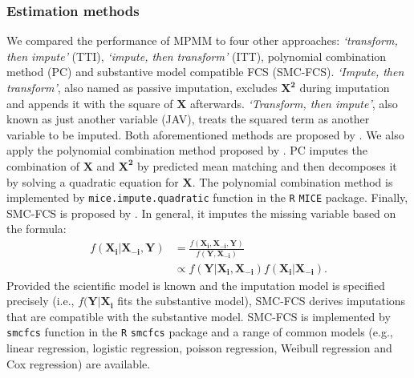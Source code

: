 	\subsubsection{Estimation methods}
	We compared the performance of MPMM to four other approaches: \emph{`transform, then impute'} (TTI), \emph{`impute, then transform'} (ITT), polynomial combination method (PC) and substantive model compatible FCS (SMC-FCS). \emph{`Impute, then transform'}, also named as passive imputation, excludes $\boldsymbol{X^2}$ during imputation and appends it with the square of $\boldsymbol{X}$ afterwards. \emph{`Transform, then impute'}, also known as just another variable (JAV), treats the squared term as another variable to be imputed. Both aforementioned methods are proposed by \citet{vonhippe2009}. We also apply the polynomial combination method proposed by \citet{Vink2013}. PC imputes the combination of $\boldsymbol{X}$ and $\boldsymbol{X^2}$ by predicted mean matching and then decomposes it by solving a quadratic equation for $\boldsymbol{X}$. The polynomial combination method is implemented by \texttt{mice.impute.quadratic} function in the \texttt{R} \texttt{MICE} package. Finally, SMC-FCS is proposed by \citet{bartlett2015multiple}. In general, it imputes the missing variable based on the formula:
	\begin{equation}
		\begin{array}{ll}
			f(\boldsymbol{X_{i}}|\boldsymbol{X_{-i}}, \boldsymbol{Y}) &= \frac{f(\boldsymbol{X_{i}}, \boldsymbol{X_{-i}}, \boldsymbol{Y})}{f(\boldsymbol{Y}, \boldsymbol{X_{-i}})}\\
			&\propto f(\boldsymbol{Y}|\boldsymbol{X_{i}}, \boldsymbol{X_{-i}})f(\boldsymbol{X_{i}}|\boldsymbol{X_{-i}}).
		\end{array} 
	\end{equation}
	Provided the scientific model is known and the imputation model is specified precisely (i.e., $f(\boldsymbol{Y}|\boldsymbol{X_{i}}$ fits the substantive model), SMC-FCS derives imputations that are compatible with the substantive model. SMC-FCS is implemented by \texttt{smcfcs} function in the \texttt{R} \texttt{smcfcs} package and a range of common models (e.g., linear regression, logistic regression, poisson regression, Weibull regression and Cox regression) are available.
 
	
